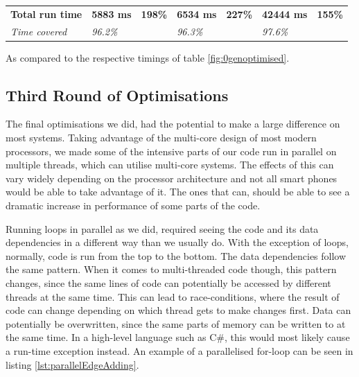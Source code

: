 \begin{table}[H]
\begin{tabular}{@{}lllllll@{}}
        \textbf{Total run time} & \textbf{5883 ms}                                                                          & \textbf{198\%}                                                                 & \textbf{6534 ms}                                                                           & \textbf{227\%}                                                                & \textbf{42444 ms}                                                                       & \textbf{155\%}                                                                \\
        \textit{Time covered}   & \textit{96.2\%}                                                                           & \textit{}                                                                      & \textit{96.3\%}                                                                            &                                                                               & \textit{97.6\%}                                                                         & \textit{}                                                                     \\ \bottomrule
    \end{tabular}
    \begin{tablenotes}
        \footnotesize{\item \textdagger As compared to the respective timings of table \ref{fig:0genoptimised}.}
    \end{tablenotes}
\end{table}

\subsection{Third Round of Optimisations}
The final optimisations we did, had the potential to make a large difference on most systems.
Taking advantage of the multi-core design of most modern processors, we made some of the intensive parts of our code run in parallel on multiple threads, which can utilise multi-core systems.
The effects of this can vary widely depending on the processor architecture and not all smart phones would be able to take advantage of it.
The ones that can, should be able to see a dramatic increase in performance of some parts of the code.

Running loops in parallel as we did, required seeing the code and its data dependencies in a different way than we usually do.
With the exception of loops, normally, code is run from the top to the bottom.
The data dependencies follow the same pattern.
When it comes to multi-threaded code though, this pattern changes, since the same lines of code can potentially be accessed by different threads at the same time.
This can lead to race-conditions, where the result of code can change depending on which thread gets to make changes first.
Data can potentially be overwritten, since the same parts of memory can be written to at the same time.
In a high-level language such as C\#, this would most likely cause a run-time exception instead.
An example of a parallelised for-loop can be seen in listing \ref{lst:parallelEdgeAdding}.

